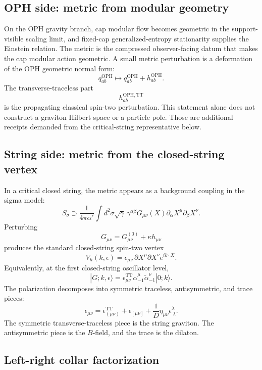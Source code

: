 \documentclass[11pt]{article}
\theoremstyle{remark}
\theoremstyle{plain}
\newcommand{\OPH}{\mathrm{OPH}}
\newcommand{\TT}{\mathrm{TT}}
\begin{document}
\subsection{OPH side: metric from modular geometry}

On the OPH gravity branch, cap modular flow becomes geometric in the support-visible scaling
limit, and fixed-cap generalized-entropy stationarity supplies the Einstein relation. The metric is
the compressed observer-facing datum that makes the cap modular action geometric. A small metric
perturbation is a deformation of the OPH geometric normal form:
\[
q_{ab}^{\OPH}\longmapsto q_{ab}^{\OPH}+h_{ab}^{\OPH}.
\]
The transverse-traceless part
\[
h_{ab}^{\OPH,\TT}
\]
is the propagating classical spin-two perturbation. This statement alone does not construct a
graviton Hilbert space or a particle pole. Those are additional receipts demanded from the
critical-string representative below.

\subsection{String side: metric from the closed-string vertex}

In a critical closed string, the metric appears as a background coupling in the sigma model:
\[
S_\sigma\supset
\frac{1}{4\pi\alpha'}
\int d^2\sigma\sqrt\gamma\,\gamma^{\alpha\beta}
G_{\mu\nu}(X)\partial_\alpha X^\mu\partial_\beta X^\nu.
\]
Perturbing
\[
G_{\mu\nu}=G^{(0)}_{\mu\nu}+\kappa h_{\mu\nu}
\]
produces the standard closed-string spin-two vertex
\[
V_h(k,\epsilon)=
\epsilon_{\mu\nu}\,
\partial X^\mu\bar\partial X^\nu e^{ik\cdot X}.
\]
Equivalently, at the first closed-string oscillator level,
\[
|G;k,\epsilon\rangle
=
\epsilon_{\mu\nu}^{\TT}
\alpha_{-1}^{\mu}\tilde\alpha_{-1}^{\nu}|0;k\rangle .
\]
The polarization decomposes into symmetric traceless, antisymmetric, and trace pieces:
\[
\epsilon_{\mu\nu}
=\epsilon^{\TT}_{(\mu\nu)}
+\epsilon_{[\mu\nu]}
+\frac1D\eta_{\mu\nu}\epsilon^\lambda_{\ \lambda}.
\]
The symmetric transverse-traceless piece is the string graviton. The antisymmetric piece is the
\(B\)-field, and the trace is the dilaton.

\subsection{Left-right collar factorization}
\end{document}
